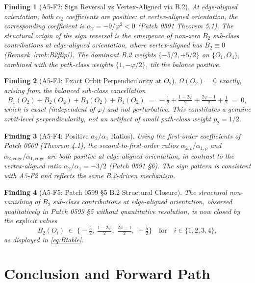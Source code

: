 \documentclass[11pt]{article}
\newtheorem{finding}{Finding}
\begin{document}
\begin{finding}[A5-F2: Sign Reversal vs Vertex-Aligned via B.2]\label{find:A5F2}
At edge-aligned orientation, both $\alpha_2$ coefficients are positive;
at vertex-aligned orientation, the corresponding coefficient is
$\alpha_2 = -9/\varphi^2 < 0$ (Patch 0591 Theorem 5.1). The structural
origin of the sign reversal is the emergence of non-zero $B_2$ sub-class
contributions at edge-aligned orientation, where vertex-aligned has
$B_2 \equiv 0$ (Remark~\ref{rmk:B2flip}). The dominant B.2 weights
$\{-5/2, +5/2\}$ on $\{O_1, O_4\}$, combined with the path-class weights
$\{1, -\varphi/2\}$, tilt the balance positive.
\end{finding}

\begin{finding}[A5-F3: Exact Orbit Perpendicularity at $O_2$]\label{find:A5F3}
$\Omega(O_2) = 0$ exactly, arising from the balanced sub-class
cancellation
\[
B_1(O_2) + B_2(O_2) + B_3(O_2) + B_4(O_2)
\;=\; -\tfrac{1}{2} + \tfrac{1-2\varphi}{2} + \tfrac{2\varphi-1}{2}
+ \tfrac{1}{2} \;=\; 0,
\]
which is exact (independent of $\varphi$) and not perturbative. This
constitutes a genuine orbit-level perpendicularity, not an artifact of
small path-class weight $p_2 = 1/2$.
\end{finding}

\begin{finding}[A5-F4: Positive $\alpha_2/\alpha_1$ Ratios]\label{find:A5F4}
Using the first-order coefficients of Patch 0600 (Theorem 4.1), the
second-to-first-order ratios $\alpha_{2,\rho}/\alpha_{1,\rho}$ and
$\alpha_{2,\text{edge}}/\alpha_{1,\text{edge}}$ are both positive at
edge-aligned orientation, in contrast to the vertex-aligned ratio
$\alpha_2/\alpha_1 = -3/2$ (Patch 0591 §6). The sign pattern is
consistent with A5-F2 and reflects the same B.2-driven mechanism.
\end{finding}

\begin{finding}[A5-F5: Patch 0599 §5 B.2 Structural Closure]\label{find:A5F5}
The structural non-vanishing of $B_2$ sub-class contributions at
edge-aligned orientation, observed qualitatively in Patch 0599 §5
without quantitative resolution, is now closed by the explicit values
\[
B_2(O_i) \;\in\; \bigl\{-\tfrac{5}{2},\; \tfrac{1-2\varphi}{2},\;
\tfrac{2\varphi-1}{2},\; +\tfrac{5}{2}\bigr\}
\quad\text{for}\quad
i \in \{1, 2, 3, 4\},
\]
as displayed in \eqref{eq:Btable}.
\end{finding}

\section{Conclusion and Forward Path}
\end{document}

